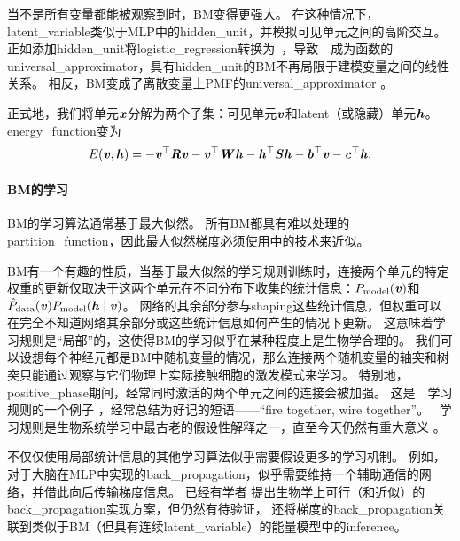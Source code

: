 当不是所有变量都能被观察到时，\gls{BM}变得更强大。
在这种情况下，\gls{latent_variable}类似于\gls{MLP}中的\gls{hidden_unit}，并模拟可见单元之间的高阶交互。
正如添加\gls{hidden_unit}将\gls{logistic_regression}转换为~，导致~~成为函数的\gls{universal_approximator}，具有\gls{hidden_unit}的\gls{BM}不再局限于建模变量之间的线性关系。
相反，\gls{BM}变成了离散变量上\gls{PMF}的\gls{universal_approximator} \citep{LeRoux-Bengio-2008}。


正式地，我们将单元$\boldsymbol{\mathit{x}}$分解为两个子集：可见单元$\boldsymbol{\mathit{v}}$和\gls{latent}（或隐藏）单元$\boldsymbol{\mathit{h}}$。
\gls{energy_function}变为
\begin{align}
 E(\boldsymbol{\mathit{v}}, \boldsymbol{\mathit{h}}) = -\boldsymbol{\mathit{v}}^\top \boldsymbol{\mathit{R}} \boldsymbol{\mathit{v}} - \boldsymbol{\mathit{v}}^\top \boldsymbol{\mathit{W}} \boldsymbol{\mathit{h}} - \boldsymbol{\mathit{h}}^\top \boldsymbol{\mathit{S}} \boldsymbol{\mathit{h}} - \boldsymbol{\mathit{b}}^\top \boldsymbol{\mathit{v}} - \boldsymbol{\mathit{c}}^\top \boldsymbol{\mathit{h}}.
\end{align}
\paragraph{\gls{BM}的学习}\gls{BM}的学习算法通常基于最大似然。
所有\gls{BM}都具有难以处理的\gls{partition_function}，因此最大似然梯度必须使用中的技术来近似。


\gls{BM}有一个有趣的性质，当基于最大似然的学习规则训练时，连接两个单元的特定权重的更新仅取决于这两个单元在不同分布下收集的统计信息：$P_{\text{model}}(\boldsymbol{\mathit{v}})$和$\hat{P}_{\text{data}}(\boldsymbol{\mathit{v}}) P_{\text{model}}(\boldsymbol{\mathit{h}}  \mid  \boldsymbol{\mathit{v}})$。
网络的其余部分参与\gls{shaping}这些统计信息，但权重可以在完全不知道网络其余部分或这些统计信息如何产生的情况下更新。
这意味着学习规则是``局部''的，这使得\gls{BM}的学习似乎在某种程度上是生物学合理的。
我们可以设想每个神经元都是\gls{BM}中随机变量的情况，那么连接两个随机变量的轴突和树突只能通过观察与它们物理上实际接触细胞的激发模式来学习。
特别地，\gls{positive_phase}期间，经常同时激活的两个单元之间的连接会被加强。
这是~~学习规则\citep{Hebb49}的一个例子 ，经常总结为好记的短语——``fire together, wire together''。
~学习规则是生物系统学习中最古老的假设性解释之一，直至今天仍然有重大意义 \citep{DelGuidice-et-al-2009}。


不仅仅使用局部统计信息的其他学习算法似乎需要假设更多的学习机制。
例如，对于大脑在\gls{MLP}中实现的\gls{back_propagation}，似乎需要维持一个辅助通信的网络，并借此向后传输梯度信息。
已经有学者\citep{Hinton-DL2007,Bengio-arxiv2015} 提出生物学上可行（和近似）的\gls{back_propagation}实现方案，但仍然有待验证，\citet{Bengio-arxiv2015} 还将梯度的\gls{back_propagation}关联到类似于\gls{BM}（但具有连续\gls{latent_variable}）的能量模型中的\gls{inference}。

